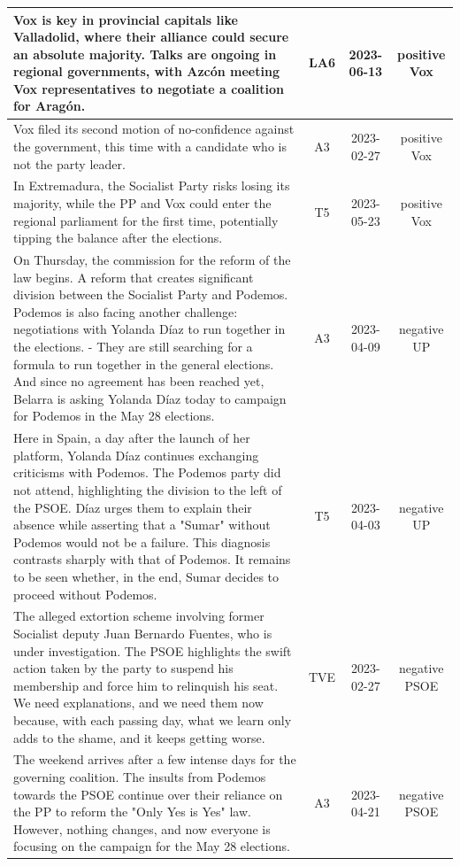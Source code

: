\documentclass[12pt]{article}
\begin{document}
\begin{longtable}{|p{8cm}|c|c|c|}
		\hline
		Vox is key in provincial capitals like Valladolid, where their alliance could secure an absolute majority. Talks are ongoing in regional governments, with Azc\'on meeting Vox representatives to negotiate a coalition for Arag\'on. & LA6 & 2023-06-13 & positive Vox \\
		\hline
		Vox filed its second motion of no-confidence against the government, this time with a candidate who is not the party leader. & A3 & 2023-02-27 & positive Vox \\
		\hline
		In Extremadura, the Socialist Party risks losing its majority, while the PP and Vox could enter the regional parliament for the first time, potentially tipping the balance after the elections. & T5 & 2023-05-23 & positive Vox \\
		\hline
		On Thursday, the commission for the reform of the law begins. A reform that creates significant division between the Socialist Party and Podemos. Podemos is also facing another challenge: negotiations with Yolanda Díaz to run together in the elections. - They are still searching for a formula to run together in the general elections. And since no agreement has been reached yet, Belarra is asking Yolanda Díaz today to campaign for Podemos in the May 28 elections. & A3 & 2023-04-09 & negative UP\\
		\hline
		Here in Spain, a day after the launch of her platform, Yolanda Díaz continues exchanging criticisms with Podemos. The Podemos party did not attend, highlighting the division to the left of the PSOE. Díaz urges them to explain their absence while asserting that a "Sumar" without Podemos would not be a failure. This diagnosis contrasts sharply with that of Podemos. It remains to be seen whether, in the end, Sumar decides to proceed without Podemos. & T5 & 2023-04-03 & negative UP \\
		\hline
		The alleged extortion scheme involving former Socialist deputy Juan Bernardo Fuentes, who is under investigation. The PSOE highlights the swift action taken by the party to suspend his membership and force him to relinquish his seat.
		We need explanations, and we need them now because, with each passing day, what we learn only adds to the shame, and it keeps getting worse. & TVE & 2023-02-27 & negative PSOE \\
		\hline
		The weekend arrives after a few intense days for the governing coalition. The insults from Podemos towards the PSOE continue over their reliance on the PP to reform the "Only Yes is Yes" law. However, nothing changes, and now everyone is focusing on the campaign for the May 28 elections. & A3 & 2023-04-21 & negative PSOE\\

\end{longtable}
\end{document}
